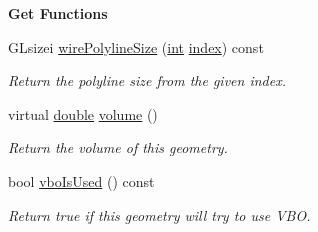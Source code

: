 \begin{Indent}{\bf Get Functions}
\begin{DoxyCompactItemize}
G\-Lsizei \hyperlink{class_g_l_c___geometry_ad8faf79be544a9af7fcff1ce60deb424}{wire\-Polyline\-Size} (\hyperlink{ioapi_8h_a787fa3cf048117ba7123753c1e74fcd6}{int} \hyperlink{glext_8h_ab47dd9958bcadea08866b42bf358e95e}{index}) const 
\begin{DoxyCompactList}\small\item\em Return the polyline size from the given index. \end{DoxyCompactList}\item 
virtual \hyperlink{_super_l_u_support_8h_a8956b2b9f49bf918deed98379d159ca7}{double} \hyperlink{class_g_l_c___geometry_a2b49b7cc19e660449b0b26f8c7140799}{volume} ()
\begin{DoxyCompactList}\small\item\em Return the volume of this geometry. \end{DoxyCompactList}\item 
bool \hyperlink{class_g_l_c___geometry_aa1e43c636b495c5430a5a020a9173bf5}{vbo\-Is\-Used} () const 
\begin{DoxyCompactList}\small\item\em Return true if this geometry will try to use V\-B\-O. \end{DoxyCompactList}\end{DoxyCompactItemize}
\end{Indent}
